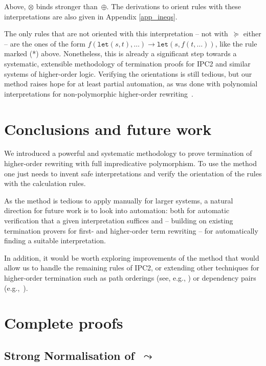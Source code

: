 \documentclass[a4paper,UKenglish,cleveref,autoref,numberwithinsect]{lipics-v2019}
\theoremstyle{definition}
\newcommand{\arrW}{\leadsto}
\newcommand{\red}{\longrightarrow}
\begin{document}
Above, $\otimes$ binds stronger than~$\oplus$. The derivations to
orient rules with these interpretations are also given in Appendix
\ref{app_ineqs}.

The only rules that are not oriented with this interpretation -- not
with~$\succeq$ either -- are the ones of the form
$f(\mathtt{let}(s,t), \dots) \red \mathtt{let}(s,f(t,\dots))$, like
the rule marked (*) above. Nonetheless, this is already a significant
step towards a systematic, extensible methodology of termination proofs
for IPC2 and similar systems of higher-order logic. Verifying the
orientations is still tedious, but our method raises hope for at least
partial automation, as was done with polynomial interpretations for
non-polymorphic higher-order rewriting~\cite{FuhsKop2012}.

\section{Conclusions and future work}

We introduced a powerful and systematic methodology to prove
termination of higher-order rewriting with full impredicative
polymorphism. To use the method one just needs to invent safe
interpretations and verify the orientation of the rules with the
calculation rules.

As the method is tedious to apply manually for larger systems, a
natural direction for future work is to look into automation: both for
automatic verification that a given interpretation suffices and --
building on existing termination provers for first- and higher-order
term rewriting -- for automatically finding a suitable interpretation.

In addition, it would be worth exploring improvements of the method
that would allow us to handle the remaining rules of IPC2, or
extending other techniques for higher-order termination such as path
orderings (see, e.g., \cite{jou:rub:99}) or dependency pairs
(e.g.,~\cite{kop:raa:12,suz:kus:bla:11}).



\clearpage
\appendix

\section{Complete proofs}\label{app_proofs}

\subsection{Strong Normalisation of~$\arrW$}
\end{document}
